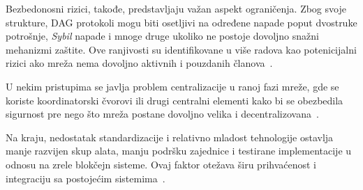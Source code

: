 Bezbedonosni rizici, takođe, predstavljaju važan aspekt ograničenja. Zbog svoje strukture, DAG protokoli mogu biti osetljivi na određene napade poput dvostruke potrošnje, \textit{Sybil} napade i mnoge druge ukoliko ne postoje dovoljno snažni mehanizmi zaštite. Ove ranjivosti su identifikovane u više radova kao potenicijalni rizici ako mreža nema dovoljno aktivnih i pouzdanih članova~\cite{blockeden DAG}.

U nekim pristupima se javlja problem centralizacije u ranoj fazi mreže, gde se koriste koordinatorski čvorovi ili drugi centralni elementi kako bi se obezbedila sigurnost pre nego što mreža postane dovoljno velika i decentralizovana~\cite{web3 gate DAG in Technology}. 

Na kraju, nedostatak standardizacije i relativno mladost tehnologije ostavlja manje razvijen skup alata, manju podršku zajednice i testirane implementacije u odnosu na zrele blokčejn sisteme. Ovaj faktor otežava širu prihvaćenost i integraciju sa postojećim sistemima~\cite{difference between DAG and Blockchain}.